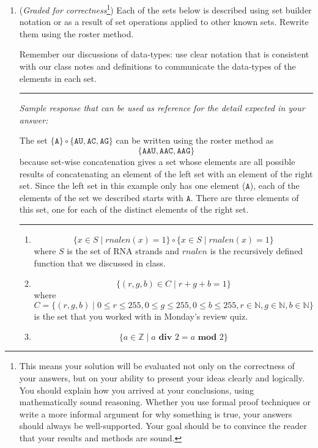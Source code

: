 \documentclass[12pt, oneside]{article}
\newcommand{\A}[0]{\texttt{A}}
\newcommand{\C}[0]{\texttt{C}}
\newcommand{\G}[0]{\texttt{G}}
\newcommand{\U}[0]{\texttt{U}}
\begin{document}
\begin{enumerate}

\item ({\it Graded for correctness}\footnote{This means your solution will be
evaluated not only on the correctness of your answers, but on your ability to 
present your ideas clearly and logically. You should explain how you arrived at 
your conclusions, using 
mathematically sound reasoning. Whether you use formal proof techniques or 
write a more informal argument for why 
something is true, your answers should always be well-supported. Your goal 
should be to convince the reader that 
your results and methods are sound.}) Each of the sets below is described 
using set builder notation or as a result of set operations
applied to other known sets.  Rewrite them using the roster method.

Remember our discussions of data-types: use clear notation that 
is consistent with our class notes and definitions 
to communicate the data-types of the elements in each set.


\rule{0.5\textwidth}{.4pt}

{\it Sample response that can be used as reference for the detail expected 
in your answer:} 

The set $\{ \A \} \circ \{ \A\U, \A\C, \A\G\}$ can be written using
the roster method as 
\[
\{ \A\A\U, \A\A\C, \A\A\G \}
\]
because set-wise concatenation gives a set whose elements are 
all possible results of concatenating an element of the 
left set with an 
element of the right set. Since the left set in this example only
has one element ($\A$), each of the elements of the set we 
described starts with $\A$. There are three elements of this set, 
one for each of the distinct elements of the right set.

\rule{0.5\textwidth}{.4pt}

\begin{enumerate}
\item $$\{ x \in S \mid rnalen(x) = 1 \} \circ \{x \in S \mid rnalen(x) = 1 \}$$
where $S$ is the set of RNA strands and $rnalen$ is the recursively defined
function that we discussed in class.
\item $$\{ (r,g,b) \in C \mid r+g+b = 1\}$$ where 
$C = \{ (r,g,b) \mid 0 \leq r \leq 255, 0 \leq g \leq 255, 0 \leq b \leq 255, r \in \mathbb{N}, g \in \mathbb{N}, b \in \mathbb{N} \}$
is the set that you worked with in Monday's review quiz.
\item $$\{ a \in \mathbb{Z} \mid  a \textbf{ div } 2 = a \textbf{ mod } 2\}$$
\end{enumerate}


\end{enumerate}
\end{document}
